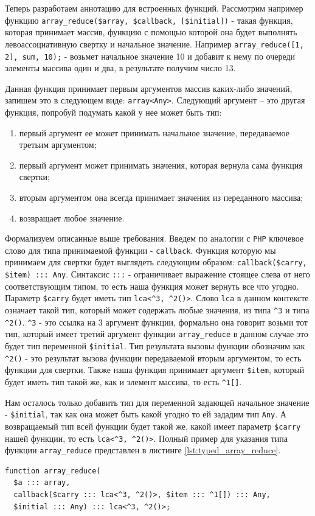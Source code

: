 Теперь разработаем аннотацию для встроенных функций.
Рассмотрим например функцию \verb|array_reduce($array, $callback, [$initial])| - такая функция, которая принимает массив, функцию с помощью которой она будет выполнять левоассоциативную свертку \cite{foldl} и начальное значение.
Например \verb|array_reduce([1, 2], sum, 10);| - возьмет начальное значение 10 и добавит к нему по очереди элементы массива один и два, в результате получим число 13.

Данная функция принимает первым аргументов массив каких-либо значений, запишем это в следующем виде: \verb|array<Any>|.
Следующий аргумент -- это другая функция, попробуй подумать какой у нее может быть тип:
\begin{enumerate}
  \item первый аргумент ее может принимать начальное значение, передаваемое третьим аргументом;
  \item первый аргумент может принимать значения, которая вернула сама функция свертки;
  \item вторым аргументом она всегда принимает значения из переданного массива;
  \item возвращает любое значение.
\end{enumerate}

Формализуем описанные выше требования.
Введем по аналогии с \verb|PHP| ключевое слово для типа принимаемой функции - \verb|callback|.
Функция которую мы принимаем для свертки будет выглядеть следующим образом: \verb|callback($carry, $item) ::: Any|.
Синтаксис \verb|:::| - ограничивает выражение стоящее слева от него соответствующим типом, то есть наша функция может вернуть все что угодно.
Параметр \verb|$carry| будет иметь тип \verb|lca<^3, ^2()>|.
Слово \verb|lca| в данном контексте означает такой тип, который может содержать любые значения, из типа \verb|^3| и типа \verb|^2()|.
\verb|^3| - это ссылка на 3 аргумент функции, формально она говорит возьми тот тип, который имеет третий аргумент функции \verb|array_reduce| в данном случае это будет тип переменной \verb|$initial|.
Тип результата вызовы функции обозначим как \verb|^2()| - это результат вызова функции передаваемой вторым аргументом, то есть функции для свертки.
Также наша функция принимает аргумент \verb|$item|, который будет иметь тип такой же, как и элемент массива, то есть \verb|^1[]|.

Нам осталось только добавить тип для переменной задающей начальное значение - \verb|$initial|, так как она может быть какой угодно то ей зададим тип \verb|Any|.
А возвращаемый тип всей функции будет такой же, какой имеет параметр \verb|$carry| нашей функции, то есть \verb|lca<^3, ^2()>|.
Полный пример для указания типа функции \verb|array_reduce| представлен в листинге \ref{lst:typed_array_reduce}.
\begin{lstlisting}[caption={Пример типизации функции array\_reduce},label={lst:typed_array_reduce}]
function array_reduce(
  $a ::: array,
  callback($carry ::: lca<^3, ^2()>, $item ::: ^1[]) ::: Any,
  $initial ::: Any) ::: lca<^3, ^2()>;
\end{lstlisting}

